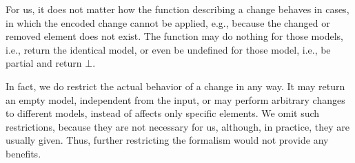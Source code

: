 For us, it does not matter how the function describing a change behaves in cases, in which the encoded change cannot be applied, e.g., because the changed or removed element does not exist. The function may do nothing for those models, i.e., return the identical model, or even be undefined for those model, i.e., be partial and return $\bot$.

In fact, we do restrict the actual behavior of a change in any way.
It may return an empty model, independent from the input, or may perform arbitrary changes to different models, instead of affects only specific elements.
We omit such restrictions, because they are not necessary for us, although, in practice, they are usually given.
Thus, further restricting the formalism would not provide any benefits.


